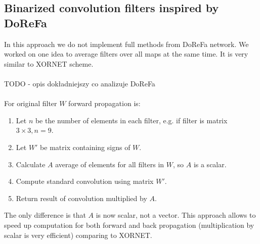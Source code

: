 \documentclass[licencjacka]{pracamgr}
\begin{document}
		\subsection{Binarized convolution filters inspired by DoReFa \cite{dorefa}}

		        In this approach we do not implement full methods from DoReFa network. We worked on one idea to average filters over all maps at the same time. It is very similar to XORNET scheme. 
		        \\\\
		        TODO - opis dokładniejszy co analizuje DoReFa 
		        \\\\
		        For original filter $W$ forward propagation is:
		        \begin{enumerate}
		                \item Let $n$ be the number of elements in each filter, e.g. if filter is matrix $3 \times 3, n=9$.
		                \item Let $W'$ be matrix containing signs of $W$.
		                \item Calculate $A$ average of elements for all filters in $W$, so $A$ is a scalar.
		                \item Compute standard convolution using matrix $W'$.
		                \item Return result of convolution multiplied by $A$.
		        \end{enumerate}

		        The only difference is that $A$ is now scalar, not a vector. This approach allows to speed up computation for both forward and back propagation (multiplication by scalar is very efficient) comparing to XORNET.
\end{document}
